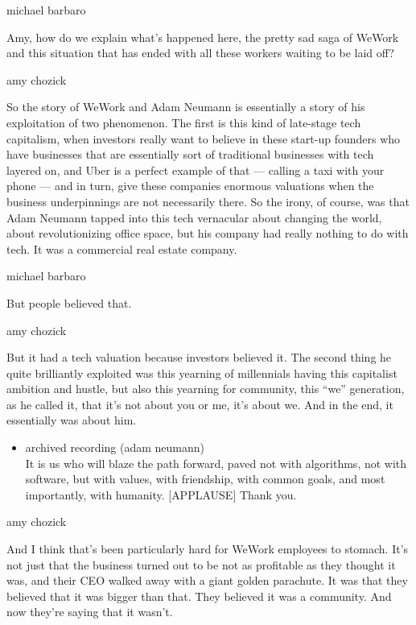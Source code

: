 michael barbaro

Amy, how do we explain what's happened here, the pretty sad saga of
WeWork and this situation that has ended with all these workers waiting
to be laid off?

amy chozick

So the story of WeWork and Adam Neumann is essentially a story of his
exploitation of two phenomenon. The first is this kind of late-stage
tech capitalism, when investors really want to believe in these start-up
founders who have businesses that are essentially sort of traditional
businesses with tech layered on, and Uber is a perfect example of that
--- calling a taxi with your phone --- and in turn, give these companies
enormous valuations when the business underpinnings are not necessarily
there. So the irony, of course, was that Adam Neumann tapped into this
tech vernacular about changing the world, about revolutionizing office
space, but his company had really nothing to do with tech. It was a
commercial real estate company.

michael barbaro

But people believed that.

amy chozick

But it had a tech valuation because investors believed it. The second
thing he quite brilliantly exploited was this yearning of millennials
having this capitalist ambition and hustle, but also this yearning for
community, this ``we'' generation, as he called it, that it's not about
you or me, it's about we. And in the end, it essentially was about him.

\begin{itemize}
\tightlist
\item
  archived recording (adam neumann)\\
  It is us who will blaze the path forward, paved not with algorithms,
  not with software, but with values, with friendship, with common
  goals, and most importantly, with humanity. {[}APPLAUSE{]} Thank you.
\end{itemize}

amy chozick

And I think that's been particularly hard for WeWork employees to
stomach. It's not just that the business turned out to be not as
profitable as they thought it was, and their CEO walked away with a
giant golden parachute. It was that they believed that it was bigger
than that. They believed it was a community. And now they're saying that
it wasn't.

